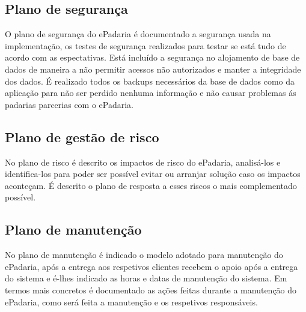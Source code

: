 \subsection{Plano de segurança}
O plano de segurança do ePadaria é documentado a segurança usada na implementação, os testes de segurança realizados para testar se está tudo de acordo com as espectativas. Está incluído a segurança no alojamento de base de dados de maneira a não permitir acessos não autorizados e manter a integridade dos dados. É realizado todos os backups necessários da base de dados como da aplicação para não ser perdido nenhuma informação e não causar problemas ás padarias parcerias com o ePadaria.
\subsection{Plano de gestão de risco}
No plano de risco é descrito os impactos de risco do ePadaria, analisá-los e identifica-los para poder ser possível evitar ou arranjar solução caso os impactos aconteçam. É descrito o plano de resposta a esses riscos o mais complementado possível.
\subsection{Plano de manutenção}
No plano de manutenção é indicado o modelo adotado para manutenção do ePadaria, após a entrega aos respetivos clientes recebem o apoio após a entrega do sistema e é-lhes indicado as horas e datas de manutenção do sistema. Em termos mais concretos é documentado as ações feitas durante a manutenção do ePadaria, como será feita a manutenção e os respetivos responsáveis.